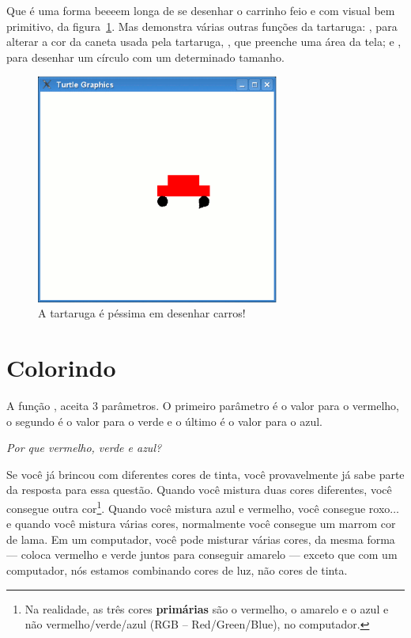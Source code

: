 {\noindent
Que é uma forma beeeem longa de se desenhar o carrinho feio e com visual bem primitivo, da figura~\ref{fig24}. Mas demonstra várias outras funções da tartaruga: , para alterar a cor da caneta usada pela tartaruga, , que preenche uma área da tela; e , para desenhar um círculo com um determinado tamanho.

\begin{figure}
\begin{center}
\includegraphics[width=80mm]{eps/figure24.eps}
\end{center}
\caption{A tartaruga é péssima em desenhar carros!}\label{fig24}
\end{figure}

\section{Colorindo}

A função , aceita 3 parâmetros. O primeiro parâmetro é o valor para o vermelho, o segundo é o valor para o verde e o último é o valor para o azul.
\par
\emph{Por que vermelho, verde e azul?}
\par
Se você já brincou com diferentes cores de tinta, você provavelmente já sabe parte da resposta para essa questão. Quando você mistura duas cores diferentes, você consegue outra cor\footnote{Na realidade, as três cores \textbf{primárias} são o vermelho, o amarelo e o azul e não vermelho/verde/azul (RGB -- Red/Green/Blue), no computador.}. Quando você mistura azul e vermelho, você consegue roxo$\ldots$ e quando você mistura várias cores, normalmente você consegue um marrom cor de lama. Em um computador, você pode misturar várias cores, da mesma forma --- coloca vermelho e verde juntos para conseguir amarelo --- exceto que com um computador, nós estamos combinando cores de luz, não cores de tinta.
 
}
